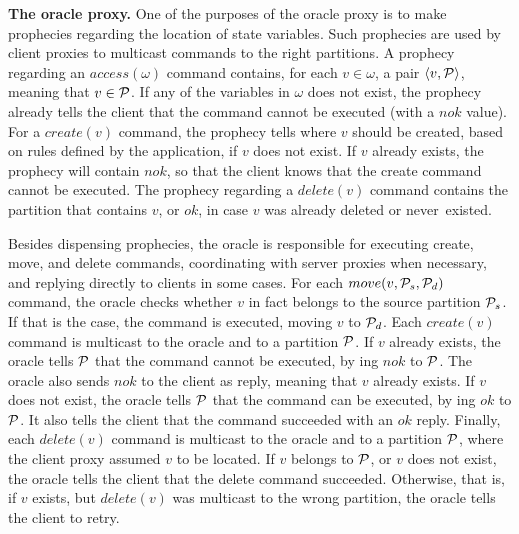 \textbf{The oracle proxy.} One of the purposes of the oracle proxy is to make
prophecies regarding the location of state variables. Such prophecies are used
by client proxies to multicast commands to the right partitions. A prophecy
regarding an $access(\omega)$ command contains, for each $v \in \omega$, a pair
$\langle v, \mathcal{P} \rangle$, meaning that $v \in \mathcal{P}$. If any of the variables in
$\omega$ does not exist, the prophecy already tells the client that the command
cannot be executed (with a $nok$ value). For a $create(v)$ command, the prophecy
tells where $v$ should be created, based on rules defined by the application, if
$v$ does not exist. If $v$ already exists, the prophecy will contain $nok$, so
that the client knows that the create command cannot be executed. The prophecy
regarding a $delete(v)$ command contains the partition that contains $v$, or
$ok$, in case $v$ was already deleted or never~existed.

Besides dispensing prophecies, the oracle is responsible for executing create,
move, and delete commands, coordinating with server proxies when necessary, and
replying directly to clients in some cases. For each $move(v,\mathcal{P}_s,\mathcal{P}_d)$
command, the oracle checks whether $v$ in fact belongs to the source partition
$\mathcal{P}_s$. If that is the case, the command is executed, moving $v$ to $\mathcal{P}_d$.
Each $create(v)$ command is multicast to the oracle and to a partition $\mathcal{P}$.
If $v$ already exists, the oracle tells $\mathcal{P}$ that the command cannot be
executed, by \rmcast{}ing $nok$ to $\mathcal{P}$. The oracle also sends $nok$ to the
client as reply, meaning that $v$ already exists. If $v$ does not exist, the
oracle tells $\mathcal{P}$ that the command can be executed, by \rmcast{}ing $ok$ to
$\mathcal{P}$. It also tells the client that the command succeeded with an $ok$ reply.
Finally, each $delete(v)$ command is multicast to the oracle and to a partition
$\mathcal{P}$, where the client proxy assumed $v$ to be located. If $v$ belongs to
$\mathcal{P}$, or $v$ does not exist, the oracle tells the client that the delete
command succeeded. Otherwise, that is, if $v$ exists, but $delete(v)$ was
multicast to the wrong partition, the oracle tells the client to retry.


